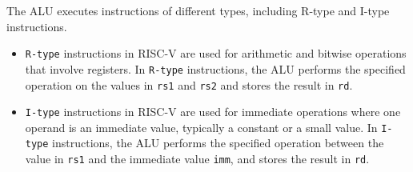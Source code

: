 \documentclass[12pt,a4paper,oneside]{book} %
\begin{document}
The ALU executes instructions of different types, including R-type and I-type instructions.
\begin{itemize}
    \item \texttt {R-type} instructions in RISC-V are used for arithmetic and bitwise operations that involve registers. In \texttt {R-type} instructions, the ALU performs the specified operation on the values in \texttt{rs1} and \texttt{rs2} and stores the result in \texttt{rd}.
    \item \texttt{I-type} instructions in RISC-V are used for immediate operations where one operand is an immediate value, typically a constant or a small value. In \texttt{I-type} instructions, the ALU performs the specified operation between the value in \texttt{rs1} and the immediate value \texttt{imm}, and stores the result in \texttt{rd}.
\end{itemize}
\end{document}
